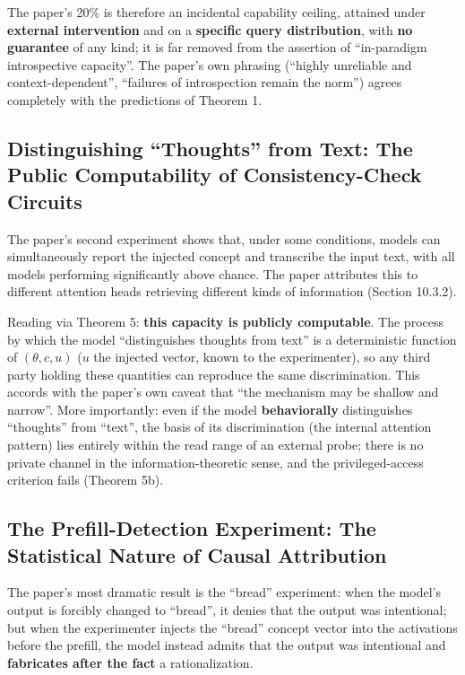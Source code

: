The paper's 20\% is therefore an incidental capability ceiling, attained under \textbf{external
intervention} and on a \textbf{specific query distribution}, with \textbf{no guarantee} of any
kind; it is far removed from the assertion of ``in-paradigm introspective capacity''. The paper's
own phrasing (``highly unreliable and context-dependent'', ``failures of
introspection remain the norm''\cite{lindsey-2026-introspection}) agrees completely with the
predictions of
Theorem 1.

\subsection{Distinguishing ``Thoughts'' from Text: The Public Computability of Consistency-Check Circuits}

The paper's second experiment shows that, under some conditions, models can simultaneously
report the injected concept and transcribe the input text, with all models performing
significantly above chance\cite{lindsey-2026-introspection}. The paper attributes this to
different attention heads retrieving different kinds of information (Section 10.3.2).

Reading via Theorem 5: \textbf{this capacity is publicly computable}. The process by which the
model ``distinguishes thoughts from text'' is a deterministic function of $(\theta, c, u)$
($u$ the injected vector, known to the experimenter), so any third party holding these
quantities can reproduce the same discrimination. This accords with the paper's own caveat
that ``the mechanism may be shallow and narrow''\cite{lindsey-2026-introspection}. More
importantly: even if the model \textbf{behaviorally} distinguishes ``thoughts'' from ``text'',
the basis of its discrimination (the internal attention pattern) lies entirely within the
read range of an external probe; there is no private channel in the information-theoretic
sense, and the privileged-access criterion\cite{song-privileged-2025} fails (Theorem 5b).

\subsection{The Prefill-Detection Experiment: The Statistical Nature of Causal Attribution}

The paper's most dramatic result is the ``bread'' experiment\cite{lindsey-2026-introspection}:
when the model's output is forcibly changed to ``bread'', it denies that the output was
intentional; but when the experimenter injects the ``bread'' concept vector into the activations
before the prefill, the model instead admits that the output was intentional and
\textbf{fabricates after the fact} a rationalization.

